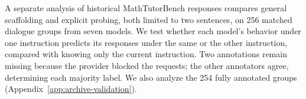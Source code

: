 A separate analysis of historical MathTutorBench responses
\citep{macina2025mathtutorbench} compares general scaffolding and explicit
probing, both limited to two sentences, on 256 matched dialogue groups from
seven models. We test whether each model's behavior under one instruction
predicts its responses under the same or the other instruction, compared with
knowing only the current instruction. Two annotations remain missing because
the provider blocked the requests; the other annotators agree, determining
each majority label. We also analyze the 254 fully annotated groups
(Appendix~\ref{app:archive-validation}).
